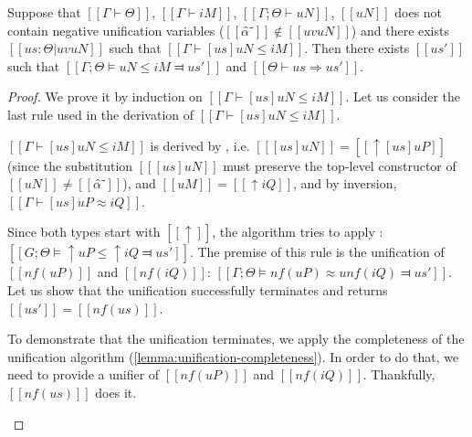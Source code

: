 \begin{lemma}
    Suppose that $[[Γ ⊢ Θ]]$, $[[Γ ⊢ iM]]$, $[[Γ ; Θ ⊢ uN]]$,
    $[[uN]]$ does not contain negative unification variables ($[[α̂⁻]] \notin [[uv uN]]$)
    and there exists $[[us : Θ | uv uN]]$ such that $[[ Γ ⊢ [us]uN ≤ iM ]]$.
    Then there exists $[[us']]$ such that $[[Γ ; Θ ⊨ uN ≤ iM ⫤ us']]$
    and $[[Θ ⊢ us ⇒ us']]$.
\end{lemma}
\begin{proof}
    We prove it by induction on $[[ Γ ⊢ [us]uN ≤ iM ]]$.
    Let us consider the last rule used in the derivation of $[[ Γ ⊢ [us]uN ≤ iM ]]$.
    \begin{caseof}
        \item $[[ Γ ⊢ [us]uN ≤ iM ]]$ is derived by ,
        \label{case:subt-complete-upshift}
        i.e. $[[ [us]uN ]] = [[ ↑[us]uP ]]$ (since the substitution $[[ [us]uN ]]$ must preserve the 
        top-level constructor of $[[uN]]\neq [[α̂⁻]]$), and $[[uM]] = [[ ↑iQ ]]$,
        and by inversion, $[[ Γ ⊢ [us]uP ≈ iQ ]]$.

        Since both types start with $[[↑]]$, 
        the algorithm tries to apply : 
        $[[G;Θ ⊨ ↑uP ≤ ↑iQ ⫤ us']]$. The premise of this rule is the
        unification of $[[nf(uP)]]$ and $[[nf(iQ)]]$:
        $[[Γ;Θ ⊨ nf(uP) ≈u nf(iQ) ⫤ us']]$. Let us show that the unification successfully 
        terminates and returns $[[us']] = [[nf(us)]]$.

        To demonstrate that the unification terminates, we apply the completeness 
        of the unification algorithm (\cref{lemma:unification-completeness}). 
        In order to do that, we need to provide a unifier of 
        $[[nf(uP)]]$ and $[[nf(iQ)]]$. Thankfully, $[[nf(us)]]$ does it. 


\end{caseof}
\end{proof}
